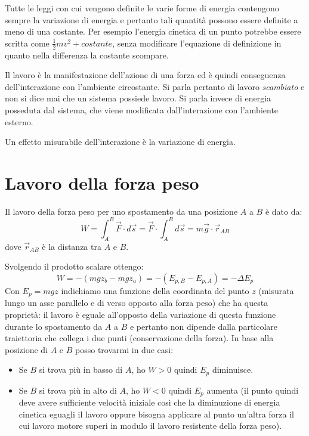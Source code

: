 \documentclass[class=book, crop=false, oneside, 12pt]{standalone}
\begin{document}
Tutte le leggi con cui vengono definite le varie forme di energia contengono sempre la variazione di energia e pertanto tali quantità possono essere definite a meno di una costante. 
Per esempio l'energia cinetica di un punto potrebbe essere scritta come \(\frac{1}{2} m v^2 + costante\), senza modificare l'equazione di definizione in quanto nella differenza la costante scompare.

Il lavoro è la manifestazione dell'azione di una forza ed è quindi conseguenza dell'interazione con l'ambiente circostante. 
Si parla pertanto di lavoro \emph{scambiato} e non si dice mai che un sistema possiede lavoro. 
Si parla invece di energia posseduta dal sistema, che viene modificata dall'interazione con l'ambiente esterno. 

Un effetto misurabile dell'interazione è la variazione di energia. 

\section{Lavoro della forza peso}

Il lavoro della forza peso per uno spostamento da una posizione \(A\) a \(B\) è dato da:
\begin{equation}
    W = \int_A^B \overrightarrow{F} \cdot d \overrightarrow{s} = \overrightarrow{F} \cdot \int_A^B d \overrightarrow{s} = m \overrightarrow{g} \cdot \overrightarrow{r}_{AB}
\end{equation}
dove \(\overrightarrow{r}_{AB}\) è la distanza tra \(A\) e \(B\).

Svolgendo il prodotto scalare ottengo:
\begin{equation}
    W = - (mgz_b - mgz_a) =- (E_{p,B} - E_{p,A}) = - \Delta E_p
\end{equation}
Con \(E_p= m g z\) indichiamo una funzione della coordinata del punto \(z\) (misurata lungo un asse parallelo e di verso opposto alla forza peso) che ha questa proprietà: il lavoro è eguale all'opposto della variazione di questa funzione durante lo spostamento da \(A\) a \(B\) e pertanto non dipende dalla particolare traiettoria che collega i due punti (conservazione della forza).\newline
In base alla posizione di \(A\) e \(B\) posso trovarmi in due casi:
\begin{itemize}
    \item Se \(B\) si trova più in basso di \(A\), ho \(W>0\) quindi \(E_p\) diminuisce.
    \item Se \(B\) si trova più in alto di \(A\), ho \(W<0\) quindi \(E_p\) aumenta 
    (il punto quindi deve avere sufficiente velocità iniziale così che la diminuzione di energia cinetica eguagli il lavoro oppure bisogna applicare al punto un'altra forza il cui lavoro motore superi in modulo il lavoro resistente della forza peso).
\end{itemize}
\end{document}
